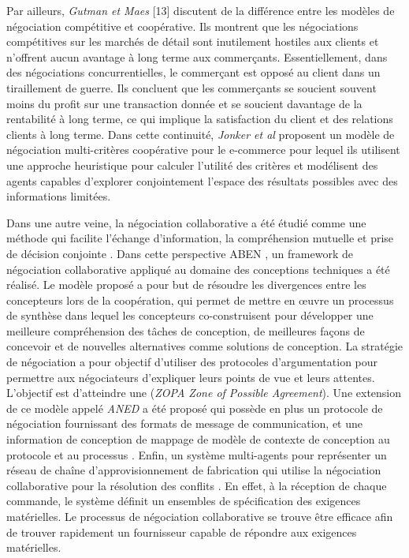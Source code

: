 		Par ailleurs, \emph{Gutman et Maes} [13] discutent de la différence entre les modèles de négociation compétitive et coopérative. Ils montrent que les négociations compétitives sur les marchés de détail sont inutilement hostiles aux clients et n'offrent aucun avantage à long terme aux commerçants.
		Essentiellement, dans des négociations concurrentielles, le commerçant est opposé au client dans un tiraillement de guerre. Ils concluent que les commerçants se soucient souvent moins du profit sur une transaction donnée et se soucient davantage de la rentabilité à long terme, ce qui implique la satisfaction du client et des relations clients à long terme. 
		Dans cette continuité, \emph{Jonker et al} \cite{jonker2007agent} proposent un modèle de négociation multi-critères coopérative pour le e-commerce pour lequel ils utilisent une approche heuristique pour calculer l'utilité des critères et modélisent des agents capables d'explorer conjointement l'espace des résultats possibles avec des informations limitées. 
	
		Dans une autre veine, la négociation collaborative a été étudié comme une méthode qui facilite l'échange d'information, la compréhension mutuelle et prise de décision conjointe \cite{jin2010study}. 
		Dans cette perspective ABEN \cite{jin2009argumentation}, un framework de négociation collaborative appliqué au domaine des conceptions techniques a été réalisé. Le modèle proposé a pour but de résoudre les divergences entre les concepteurs lors de la coopération, qui permet de mettre en œuvre un processus de synthèse dans lequel les concepteurs co-construisent pour développer une meilleure compréhension des tâches de conception, de meilleures façons de concevoir et de nouvelles alternatives comme solutions de conception. La stratégie de négociation a pour objectif d'utiliser des protocoles d'argumentation pour permettre aux négociateurs d'expliquer leurs points de vue et leurs attentes. L'objectif est d'atteindre une (\emph{ZOPA  Zone of Possible Agreement}). Une extension de ce modèle appelé \emph{ANED} a été proposé qui possède en plus un protocole de négociation fournissant des formats de message de communication, et une information de conception de mappage de modèle de contexte de conception au protocole et au processus \cite{jin2010study}. 	
		Enfin, un système multi-agents pour représenter un réseau de chaîne d'approvisionnement de fabrication qui utilise la négociation collaborative pour la résolution des conflits \cite{jiao2006agent}. En effet, à la réception de chaque commande, le système définit un ensembles de spécification des exigences matérielles. Le processus de négociation collaborative se trouve être efficace afin de trouver rapidement un fournisseur capable de répondre aux exigences matérielles.
		
